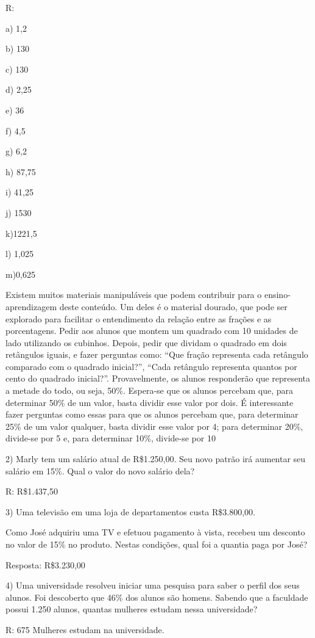 R:

a) 1,2

b) 130

c) 130

d) 2,25

e) 36

f) 4,5

g) 6,2

h) 87,75

i) 41,25

j) 1530

k)1221,5

l) 1,025

m)0,625

Existem muitos materiais manipuláveis que podem contribuir para o
ensino-aprendizagem deste conteúdo. Um deles é o material dourado, que
pode ser explorado para facilitar o entendimento da relação entre as
frações e as porcentagens. Pedir aos alunos que montem um quadrado com
10 unidades de lado utilizando os cubinhos. Depois, pedir que dividam o
quadrado em dois retângulos iguais, e fazer perguntas como: ``Que fração
representa cada retângulo comparado com o quadrado inicial?'', ``Cada
retângulo representa quantos por cento do quadrado inicial?''.
Provavelmente, os alunos responderão que representa a metade do todo, ou
seja, 50\%. Espera-se que os alunos percebam que, para determinar 50\%
de um valor, basta dividir esse valor por dois. É interessante fazer
perguntas como essas para que os alunos percebam que, para determinar
25\% de um valor qualquer, basta dividir esse valor por 4; para
determinar 20\%, divide-se por 5 e, para determinar 10\%, divide-se por
10

2) Marly tem um salário atual de R\$1.250,00. Seu novo patrão irá
aumentar seu salário em 15\%. Qual o valor do novo salário dela?

R: R\$1.437,50

3) Uma televisão em uma loja de departamentos custa R\$3.800,00.

Como José adquiriu uma TV e efetuou pagamento à vista, recebeu um
desconto no valor de 15\% no produto. Nestas condições, qual foi a
quantia paga por José?

Resposta: R\$3.230,00

4) Uma universidade resolveu iniciar uma pesquisa para saber o perfil
dos seus alunos. Foi descoberto que 46\% dos alunos são homens. Sabendo
que a faculdade possui 1.250 alunos, quantas mulheres estudam nessa
universidade?

R: 675 Mulheres estudam na universidade.

